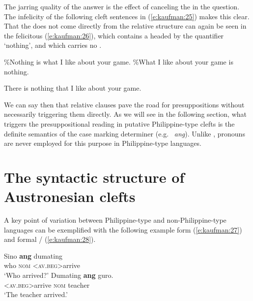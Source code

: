 \documentclass[output=paper]{langsci/langscibook}
\begin{document}
\noindent\largerpage[2]
The jarring quality of the answer is the effect of canceling the  in the question. The infelicity of the following cleft sentences in (\ref{e:kaufman:25}) makes this clear. That the  does not come directly from the relative structure can again be seen in the felicitous (\ref{e:kaufman:26}), which contains a  headed by the quantifier `nothing', and which carries no . 

\begin{exe}
	\ex\label{e:kaufman:25}
	\begin{xlist}
		\ex\label{e:kaufman:25a} \%Nothing is what I like about your game.
		\ex\label{e:kaufman:25b} \%What I like about your game is nothing.
	\end{xlist}
\end{exe}

\begin{exe}
	\ex\label{e:kaufman:26}{There is nothing that I like about your game.}
\end{exe}

\noindent
We can say then that relative clauses pave the road for presuppositions without necessarily triggering them directly. As we will see in the following section, what triggers the presuppositional reading in putative Philippine-type clefts is the definite semantics of the  case marking determiner (e.g.\  \textit{ang}). Unlike ,  pronouns are never employed for this purpose in Philippine-type languages. 

\section{\label{s:kaufman:3}The syntactic structure of Austronesian clefts}

A key point of variation between Philippine-type and non-Philippine-type  languages can be exemplified with the following example form  (\ref{e:kaufman:27}) and formal / (\ref{e:kaufman:28}).

\begin{exe}
	\ex\label{e:kaufman:27}
	\begin{xlist}
		\exi{Tagalog}
		\ex\label{e:kaufman:27a}
        \gll Sino \textbf{ang} d{\USSmaller}um{\USGreater}ating{\USQMark}\\
		who \textsc{nom} <\textsc{av.beg}>arrive\\
		\glt `Who arrived?'
		\ex\label{e:kaufman:27b}
        \gll D{\USSmaller}um{\USGreater}ating \textbf{ang} guro.\\
		<\textsc{av.beg}>arrive \textsc{nom} teacher\\
		\glt `The teacher arrived.'
	\end{xlist}
\end{exe}
\end{document}
